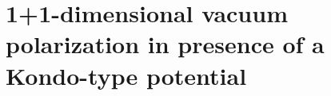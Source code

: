 \chapter{1+1-dimensional vacuum polarization in presence of a Kondo-type potential}\label{chap-vacuum}

%

%

%

